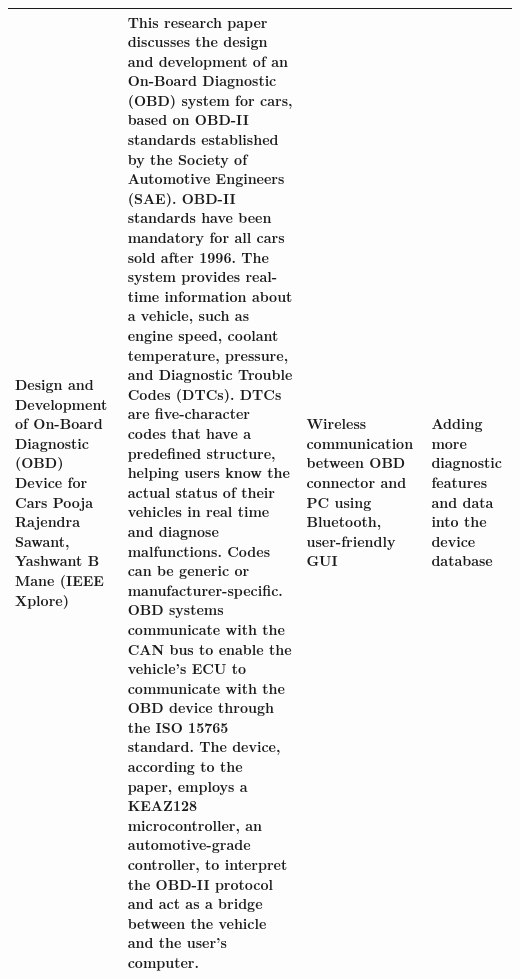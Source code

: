 \begin{longtable}{|p{}|p{}|p{}|p{}|}
\newpage
\hline
Design and Development of On-Board Diagnostic (OBD) Device for Cars
\newline
Pooja Rajendra Sawant, Yashwant B Mane
\newline
(IEEE Xplore) &
This research paper discusses the design and development of an On-Board Diagnostic (OBD) system for cars, based on OBD-II standards established by the Society of Automotive Engineers (SAE). OBD-II standards have been mandatory for all cars sold after 1996. The system provides real-time information about a vehicle, such as engine speed, coolant temperature, pressure, and Diagnostic Trouble Codes (DTCs).
\newline
DTCs are five-character codes that have a predefined structure, helping users know the actual status of their vehicles in real time and diagnose malfunctions. Codes can be generic or manufacturer-specific. OBD systems communicate with the CAN bus to enable the vehicle's ECU to communicate with the OBD device through the ISO 15765 standard.
\newline
The device, according to the paper, employs a KEAZ128 microcontroller, an automotive-grade controller, to interpret the OBD-II protocol and act as a bridge between the vehicle and the user's computer. &
Wireless communication between OBD connector and PC using Bluetooth, user-friendly GUI &
Adding more diagnostic features and data into the device database \\
\hline


\end{longtable}
